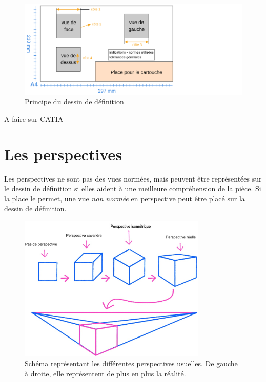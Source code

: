 \documentclass[
	11pt, %
	fleqn, %
	a4paper, %
]{LegrandOrangeBook}
\begin{document}
\begin{figure}[H] %
	\centering %
	\includegraphics[width=1.3\textwidth]{Images/cartouche.png} %
	\caption{Principe du dessin de définition}
	\label{cart} %
\end{figure}

A faire sur CATIA


\section{Les perspectives}
Les perspectives ne sont pas des vues normées, mais peuvent être représentées sur le dessin de définition si elles aident à une meilleure compréhension de la pièce. Si la place le permet, une vue \textit{non normée} en perspective peut être placé sur la dessin de définition.

\begin{figure}[H] %
	\centering %
	\includegraphics[width=0.8\textwidth]{Images/pers.jpg} %
	\caption{Schéma représentant les différentes perspectives usuelles. De gauche à droite, elle représentent de plus en plus la réalité.}
	\label{pers} %
\end{figure}
\end{document}
